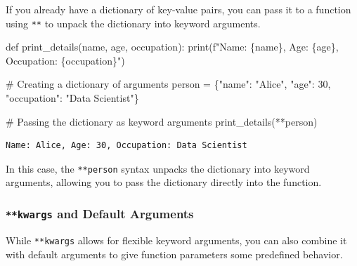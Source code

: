 \documentclass[
  letterpaper,
  DIV=11,
  numbers=noendperiod]{scrreprt}
\newenvironment{Shaded}{\begin{snugshade}}{\end{snugshade}}
\newcommand{\BuiltInTok}[1]{\textcolor[rgb]{0.00,0.23,0.31}{#1}}
\newcommand{\CommentTok}[1]{\textcolor[rgb]{0.37,0.37,0.37}{#1}}
\newcommand{\DecValTok}[1]{\textcolor[rgb]{0.68,0.00,0.00}{#1}}
\newcommand{\KeywordTok}[1]{\textcolor[rgb]{0.00,0.23,0.31}{#1}}
\newcommand{\NormalTok}[1]{\textcolor[rgb]{0.00,0.23,0.31}{#1}}
\newcommand{\OperatorTok}[1]{\textcolor[rgb]{0.37,0.37,0.37}{#1}}
\newcommand{\SpecialCharTok}[1]{\textcolor[rgb]{0.37,0.37,0.37}{#1}}
\newcommand{\SpecialStringTok}[1]{\textcolor[rgb]{0.13,0.47,0.30}{#1}}
\newcommand{\StringTok}[1]{\textcolor[rgb]{0.13,0.47,0.30}{#1}}
\begin{document}
If you already have a dictionary of key-value pairs, you can pass it to
a function using \texttt{**} to unpack the dictionary into keyword
arguments.

\begin{Shaded}
\begin{Highlighting}[]
\KeywordTok{def}\NormalTok{ print\_details(name, age, occupation):}
    \BuiltInTok{print}\NormalTok{(}\SpecialStringTok{f"Name: }\SpecialCharTok{\{}\NormalTok{name}\SpecialCharTok{\}}\SpecialStringTok{, Age: }\SpecialCharTok{\{}\NormalTok{age}\SpecialCharTok{\}}\SpecialStringTok{, Occupation: }\SpecialCharTok{\{}\NormalTok{occupation}\SpecialCharTok{\}}\SpecialStringTok{"}\NormalTok{)}

\CommentTok{\# Creating a dictionary of arguments}
\NormalTok{person }\OperatorTok{=}\NormalTok{ \{}\StringTok{"name"}\NormalTok{: }\StringTok{"Alice"}\NormalTok{, }\StringTok{"age"}\NormalTok{: }\DecValTok{30}\NormalTok{, }\StringTok{"occupation"}\NormalTok{: }\StringTok{"Data Scientist"}\NormalTok{\}}

\CommentTok{\# Passing the dictionary as keyword arguments}
\NormalTok{print\_details(}\OperatorTok{**}\NormalTok{person)}
\end{Highlighting}
\end{Shaded}

\begin{verbatim}
Name: Alice, Age: 30, Occupation: Data Scientist
\end{verbatim}

In this case, the \texttt{**person} syntax unpacks the dictionary into
keyword arguments, allowing you to pass the dictionary directly into the
function.

\hypertarget{kwargs-and-default-arguments}{%
\subsubsection{\texorpdfstring{\texttt{**kwargs} and Default
Arguments}{**kwargs and Default Arguments}}\label{kwargs-and-default-arguments}}

While \texttt{**kwargs} allows for flexible keyword arguments, you can
also combine it with default arguments to give function parameters some
predefined behavior.
\end{document}
